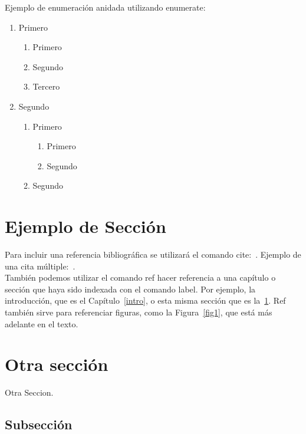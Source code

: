 \documentclass[12pt,a4paper,oneside]{book}
\begin{document}
Ejemplo de enumeración anidada utilizando enumerate:
\begin{enumerate}
    \item Primero 
        \begin{enumerate}
        \item Primero
        \item Segundo
        \item Tercero
        \end{enumerate}
    \item Segundo
        \begin{enumerate}
        \item Primero
            \begin{enumerate}
            \item Primero
            \item Segundo
            \end{enumerate}
        \item Segundo
        \end{enumerate}
\end{enumerate}



\section{Ejemplo de Sección}
\label{secc1}

Para incluir una referencia bibliográfica se utilizará el comando cite:~\cite{girard1989}.
Ejemplo de una cita múltiple:~\cite{ranta2012,tcs2015}.\\

También podemos utilizar el comando ref hacer referencia a una capítulo o sección que haya sido indexada con el comando label. Por ejemplo, la introducción, que es el Capítulo~\ref{intro}, o esta misma sección que es la~\ref{secc1}. Ref también sirve para referenciar figuras, como la Figura~\ref{fig1}, que está más adelante en el texto.



\section{Otra sección}

Otra Seccion.




\subsection{Subsección}
\end{document}
